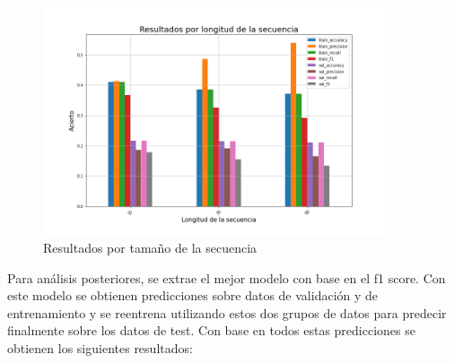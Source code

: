 \begin{figure}[H]
    \centering
    \includegraphics[width=0.9\textwidth]{results/friends/deepModels/sim_res_deep_seq_len.png}
    \caption{Resultados por tamaño de la secuencia}
    \label{fig:fri_deep_seq_len}
\end{figure}

Para análisis posteriores, se extrae el mejor modelo con base en el f1 score. Con este modelo se obtienen predicciones sobre datos de validación y de entrenamiento y se reentrena utilizando estos dos grupos de datos para predecir finalmente sobre los datos de test. Con base en todos estas predicciones se obtienen los siguientes resultados:


